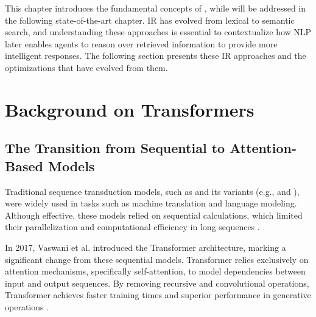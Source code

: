 \label{chap:back}

This chapter introduces the fundamental concepts of , while  will be addressed in the following state-of-the-art chapter. \gls{IR} has evolved from lexical to semantic search, and understanding these approaches is essential to contextualize how \gls{NLP} later enables agents to reason over retrieved information to provide more intelligent responses. The following section presents these \gls{IR} approaches and the optimizations that have evolved from them.
\section{Background on Transformers} 
\label{sec:transformer}
\subsection{The Transition from Sequential to Attention-Based Models}  
Traditional sequence transduction models, such as  and its variants (e.g.,  \cite{hochreiter1997lstm} and  \cite{cho2014gru}), were widely used in tasks such as machine translation and language modeling. Although effective, these models relied on sequential calculations, which limited their parallelization and computational efficiency in long sequences \cite{vaswani2017attention}.

In 2017, Vaswani et al. introduced the Transformer architecture, marking a significant change from these sequential models. Transformer relies exclusively on attention mechanisms, specifically self-attention, to model dependencies between input and output sequences. By removing recursive and convolutional operations, Transformer achieves faster training times and superior performance in generative operations \cite{vaswani2017attention}.

